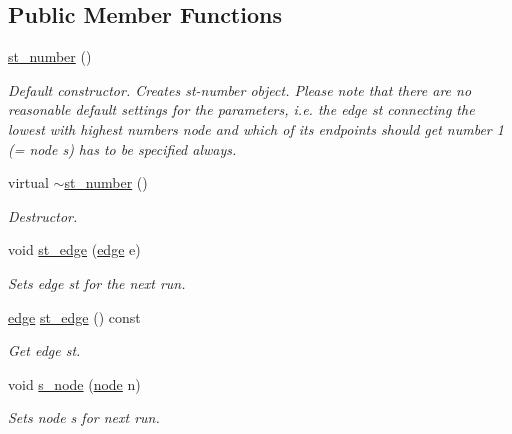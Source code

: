 \subsection*{Public Member Functions}
\begin{DoxyCompactItemize}
\item 
\mbox{\label{classst__number_a07532323fbcc643dfc419809385b64a7}} 
\mbox{\hyperlink{classst__number_a07532323fbcc643dfc419809385b64a7}{st\+\_\+number}} ()
\begin{DoxyCompactList}\small\item\em Default constructor. Creates st-\/number object. Please note that there are no reasonable default settings for the parameters, i.\+e. the edge  st connecting the lowest with highest numbers node and which of its endpoints should get number 1 (= node {\itshape s}) has to be specified always. \end{DoxyCompactList}\item 
\mbox{\label{classst__number_a4f3a2a6ceab39d106c920ee3546c259d}} 
virtual \mbox{\hyperlink{classst__number_a4f3a2a6ceab39d106c920ee3546c259d}{$\sim$st\+\_\+number}} ()
\begin{DoxyCompactList}\small\item\em Destructor. \end{DoxyCompactList}\item 
void \mbox{\hyperlink{classst__number_a1564af6f603160105643f22bf2f6955b}{st\+\_\+edge}} (\mbox{\hyperlink{classedge}{edge}} e)
\begin{DoxyCompactList}\small\item\em Sets edge {\itshape st} for the next run. \end{DoxyCompactList}\item 
\mbox{\hyperlink{classedge}{edge}} \mbox{\hyperlink{classst__number_a8938bab7883ff4194d1a7b4c6d8fb471}{st\+\_\+edge}} () const
\begin{DoxyCompactList}\small\item\em Get edge {\itshape st}. \end{DoxyCompactList}\item 
void \mbox{\hyperlink{classst__number_aa607c9aaa5a4d9c45e5854ce672f0fda}{s\+\_\+node}} (\mbox{\hyperlink{classnode}{node}} n)
\begin{DoxyCompactList}\small\item\em Sets node {\itshape s} for next run. \end{DoxyCompactList}\item 

\end{DoxyCompactItemize}
